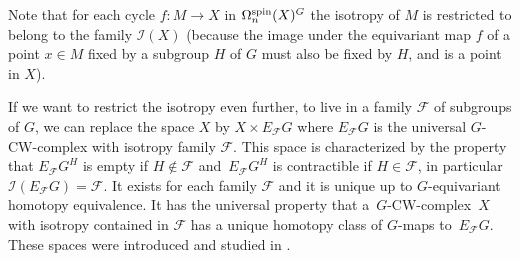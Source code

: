 \documentclass[pdftex]{sigma}
\numberwithin{equation}{section}
\begin{document}
	\begin{Remark}
		Note that for each cycle $f\colon M\to X$ in $\Omega_n^{\rm spin}(X)^G$ the
		isotropy of $M$ is restricted to belong to the family $\mathcal{I}(X)$
		(because the image under the equivariant map $f$ of a point $x\in M$ fixed by a subgroup $H$ of
		$G$ must also be fixed by $H$, and is a point in $X$).
		
		If we want to restrict the isotropy even further, to live in a family
		$\mathcal{F}$ of subgroups of $G$, we can replace the space $X$ by $X\times
		E_{\mathcal{F}}G$ where $E_{\mathcal{F}}G$ is the universal $G$-CW-complex
		with isotropy family $\mathcal{F}$. This space is characterized by the property
		that $E_{\mathcal{F}}G^H$ is empty if $H\notin \mathcal{F}$ and~$E_{\mathcal{F}}G^H$ is contractible if $H\in\mathcal{F}$, in particular $\mathcal{I}(E_{\mathcal{F}}G)=\mathcal{F}$. It exists for
		each family $\mathcal{F}$ and it is unique up to $G$-equivariant homotopy
		equivalence. It has the universal property that a~$G$-CW-complex~$X$ with
		isotropy contained in $\mathcal{F}$ has a unique homotopy class of $G$-maps
		to~$E_{\mathcal{F}}G$. These spaces were introduced and studied in \cite{tomDieck,ttd}.
	\end{Remark}
\end{document}
